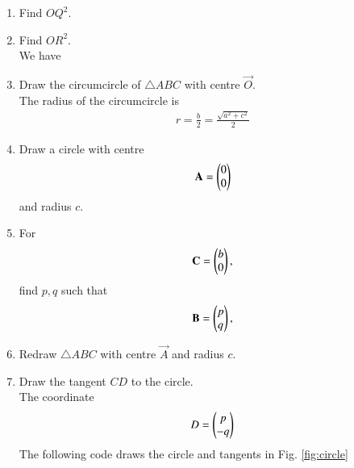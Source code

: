 \documentclass[journal,12pt,twocolumn]{IEEEtran}
\renewcommand\thesection{\arabic{section}}
\begin{document}
\begin{enumerate}[label=\thesection.\arabic*
,ref=\thesection.\theenumi]
\item Find $OQ^2$.
\item Find $OR^2$.
\\
\solution We have 
\item Draw the circumcircle of  $\triangle ABC$ with centre $\vec{O}$.  
\\
\solution The radius of the circumcircle is 
\begin{align}
\label{eq:rt_triang_circum_rad}
r=\frac{b}{2}=\frac{\sqrt{a^2+c^2}}{2}
\end{align}
\item Draw a circle with centre 
\begin{align}
\mathbf{A}=\begin{pmatrix}0 \\0\end{pmatrix}
\end{align}
%
and radius $c$.
\item For 
\begin{align}
\mathbf{C}=\begin{pmatrix}b \\0\end{pmatrix}, 
\end{align}
find $p,q$ such that
\begin{align}
\mathbf{B}=\begin{pmatrix}p \\q\end{pmatrix}, 
\end{align}
\item Redraw $\triangle ABC$ with centre $\vec{A}$ and radius $c$.
\item Draw the tangent $CD$ to the circle.
\\
\solution The coordinate
\begin{align}
\label{eq:rt_tang_pair}
D=\begin{pmatrix}p \\ -q\end{pmatrix}
\end{align}
The following code draws the circle and tangents in Fig. \ref{fig:circle}

%
\begin{figure}
\centering

\end{figure}
\end{enumerate}
\end{document}
